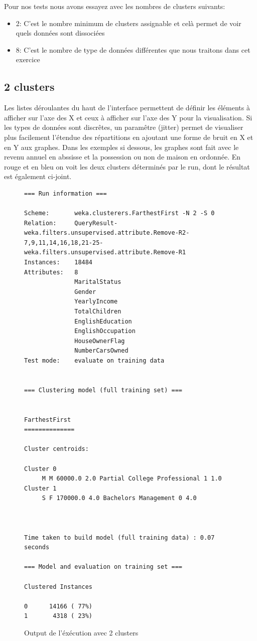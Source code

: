 Pour nos tests nous avons essayez avec les nombres de clusters suivants:
\begin{itemize}
	\item{2: C'est le nombre minimum de clusters assignable et celà permet de voir quels données sont dissociées}
	\item{8: C'est le nombre de type de données différentes que nous traitons dans cet exercice}
\end{itemize}

\subsection{2 clusters}

Les listes déroulantes du haut de l'interface permettent de définir les éléments à afficher sur l'axe des X et ceux à afficher sur l'axe des Y pour la visualisation.
Si les types de données sont discrêtes, un paramêtre (jitter) permet de visualiser plus facilement l'étendue des répartitions en ajoutant une forme de bruit en X et en Y aux graphes.
Dans les exemples si dessous, les graphes sont fait avec le revenu annuel en abssisse et la possession ou non de maison en ordonnée.
En rouge et en bleu on voit les deux clusters déterminés par le run, dont le résultat est également ci-joint.

\begin{figure}[H]
\centering
\begin{lstlisting}
=== Run information ===

Scheme:       weka.clusterers.FarthestFirst -N 2 -S 0
Relation:     QueryResult-weka.filters.unsupervised.attribute.Remove-R2-7,9,11,14,16,18,21-25-weka.filters.unsupervised.attribute.Remove-R1
Instances:    18484
Attributes:   8
              MaritalStatus
              Gender
              YearlyIncome
              TotalChildren
              EnglishEducation
              EnglishOccupation
              HouseOwnerFlag
              NumberCarsOwned
Test mode:    evaluate on training data


=== Clustering model (full training set) ===


FarthestFirst
==============

Cluster centroids:

Cluster 0
     M M 60000.0 2.0 Partial College Professional 1 1.0
Cluster 1
     S F 170000.0 4.0 Bachelors Management 0 4.0



Time taken to build model (full training data) : 0.07 seconds

=== Model and evaluation on training set ===

Clustered Instances

0      14166 ( 77%)
1       4318 ( 23%)
\end{lstlisting}
\caption{Output de l'éxécution avec 2 clusters}
\end{figure}

